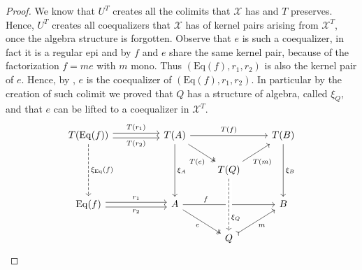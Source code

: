 \begin{subbox}{}
\begin{proof}
        We know that $U^T$ creates all the colimits that $\mathcal{X}$ has and $T$ preserves. Hence, $U^T$ creates all coequalizers that $\mathcal{X}$ has of kernel pairs arising from $\mathcal{X}^T$, once the algebra structure is forgotten. Observe that $e$ is such a coequalizer, in fact it is a regular epi and by  $f$ and $e$ share the same kernel pair, because of the factorization $f=me$ with $m$ mono. Thus $(\mathrm{Eq}(f),r_1,r_2)$ is also the kernel pair of $e$. Hence, by , $e$ is the coequalizer of $(\mathrm{Eq}(f),r_1,r_2)$. In particular by the creation of such colimit we proved that $Q$ has a structure of algebra, called $\xi_Q$, and that $e$ can be lifted to a coequalizer in $\mathcal{X}^T$.
        \[
\begin{tikzcd}
    T(\mathrm{Eq}(f)) \arrow[rr, "T(r_2)"', shift right] \arrow[rr, "T(r_1)", shift left] \arrow[dd, "\xi_\mathrm{Eq}(f)", dashed] &  & T(A) \arrow[dd, "\xi_A"] \arrow[rd, "T(e)"', pos=0.7, two heads] \arrow[rr, "T(f)"] &                                             & T(B) \arrow[dd, "\xi_B"] \\
                                                                                                                             &  &                                                                           & T(Q) \arrow[ru, "T(m)"', pos=0.3] &                          \\
    \mathrm{Eq}(f) \arrow[rr, "r_2"', shift right] \arrow[rr, "r_1", shift left]                                                &  & A \arrow[rd, "e"', two heads] \arrow[rr, "f", pos=0.25]                             &                                             & B                        \\
                                                                                                                             &  &                                                                           & Q \arrow[from=uu, "\xi_Q", pos=0.75, crossing over, dashed] \arrow[ru, "m"', tail]                    &                         
    \end{tikzcd}
\]


\end{proof}
\end{subbox}

